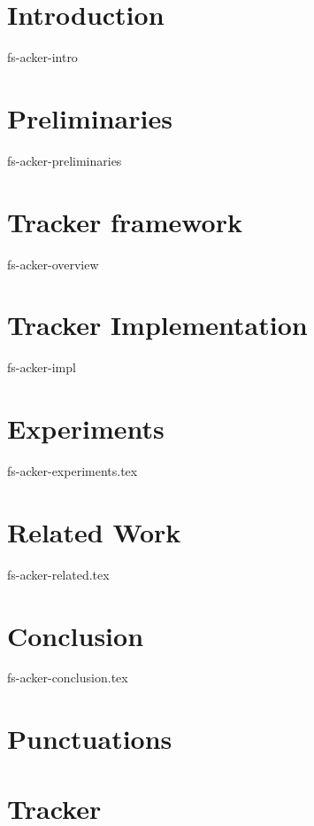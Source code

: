 \documentclass{vldb}
\newcommand {\tracker} {Tracker}
\begin{document}

\thispagestyle{empty}

\section {Introduction}
 {fs-acker-intro}

\section{Preliminaries}
 {fs-acker-preliminaries}

\section{Tracker framework}
 {fs-acker-overview}

\section{Tracker Implementation}
 {fs-acker-impl}

\section {Experiments}
 {fs-acker-experiments.tex}

\section{Related Work}
 {fs-acker-related.tex}

\section {Conclusion}
 {fs-acker-conclusion.tex}

\appendix 
\section {Punctuations} \label{appendix:punctuations-proof}
\section {\tracker} \label{appendix:tracker-proof}


% 

\end{document}
